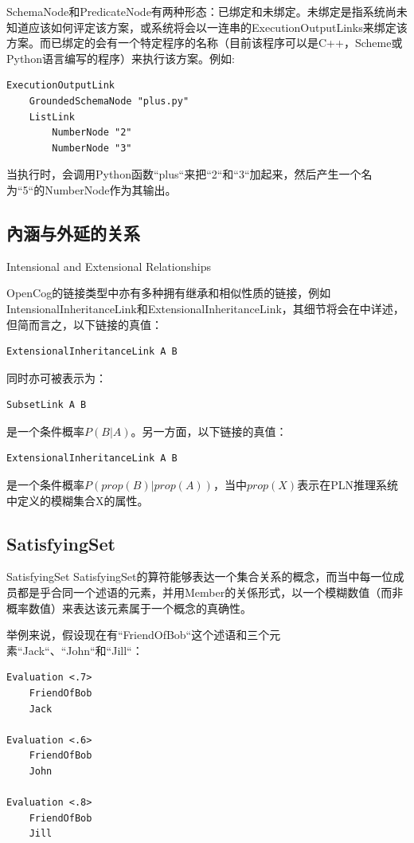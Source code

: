 SchemaNode和PredicateNode有两种形态：已绑定和未绑定。未绑定是指系统尚未知道应该如何评定该方案，或系统将会以一连串的ExecutionOutputLinks来绑定该方案。而已绑定的会有一个特定程序的名称（目前该程序可以是C++，Scheme或Python语言编写的程序）来执行该方案。例如:

\begin{verbatim}
ExecutionOutputLink
	GroundedSchemaNode "plus.py"
	ListLink
		NumberNode "2"
		NumberNode "3"
\end{verbatim}

\noindent 当执行时，会调用Python函数“plus“来把“2“和“3“加起来，然后产生一个名为“5“的NumberNode作为其输出。

\subsection{內涵与外延的关系}{Intensional and Extensional Relationships}


OpenCog的链接类型中亦有多种拥有继承和相似性质的链接，例如IntensionalInheritanceLink和ExtensionalInheritanceLink，其细节将会在\cite{PLN}中详述，但简而言之，以下链接的真值：

\begin{verbatim}
ExtensionalInheritanceLink A B
\end{verbatim}

\noindent 同时亦可被表示为：

\begin{verbatim}
SubsetLink A B
\end{verbatim}

\noindent 是一个条件概率$P(B|A)$。另一方面，以下链接的真值：

\begin{verbatim}
ExtensionalInheritanceLink A B
\end{verbatim}

\noindent 是一个条件概率$P(prop(B)|prop(A))$，当中$prop(X)$表示在PLN推理系统中定义的模糊集合X的属性。

\subsection{SatisfyingSet}{SatisfyingSet}
SatisfyingSet的算符能够表达一个集合关系的概念，而当中每一位成员都是乎合同一个述语的元素，并用Member的关係形式，以一个模糊数值（而非概率数值）来表达该元素属于一个概念的真确性。

举例来说，假设现在有“FriendOfBob“这个述语和三个元素“Jack“、“John“和“Jill“：

\begin{verbatim}
Evaluation <.7>
	FriendOfBob
	Jack

Evaluation <.6>
	FriendOfBob
	John

Evaluation <.8>
	FriendOfBob
	Jill
\end{verbatim}

